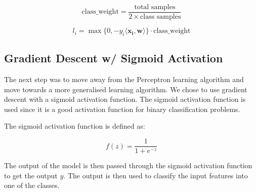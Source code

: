 \begin{equation}
  \text{class\_weight} = \frac{\text{total samples}}{2 \times \text{class samples}}
\end{equation}

\begin{equation}
  l_i = \max\{0, -y_i \langle \boldsymbol{x_i}, \boldsymbol{w} \rangle\} \cdot \text{class\_weight}
\end{equation}


\subsection{Gradient Descent w/ Sigmoid Activation}

%
%
%
%
%
%
%
%

The next step was to move away from the Perceptron learning algorithm and move towards a more generalised learning algorithm. We chose to use gradient descent with a sigmoid activation function. The sigmoid activation function is used since it is a good activation function for binary classification problems.

The sigmoid activation function is defined as:

\begin{equation}
  f(z) = \frac{1}{1 + e^{-z}}
\end{equation}

The output of the model is then passed through the sigmoid activation function to get the output $y$. The output is then used to classify the input features into one of the classes. 

